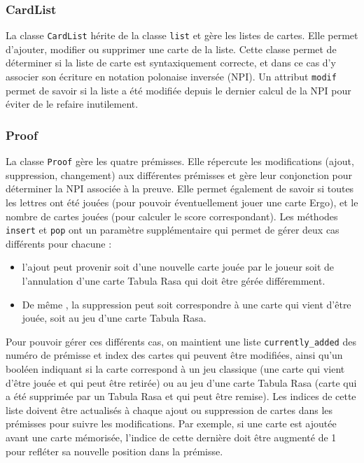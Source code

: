 \documentclass[12pt, a4paper]{article}
\begin{document}
\subsubsection{CardList}

La classe \texttt{CardList} hérite de la classe \texttt{list} et gère les listes de cartes. Elle permet d'ajouter, modifier ou supprimer une carte de la liste. Cette classe permet de déterminer si la liste de carte est syntaxiquement correcte, et dans ce cas d'y associer son écriture en notation polonaise inversée (NPI). Un attribut \texttt{modif} permet de savoir si la liste a été modifiée depuis le dernier calcul de la NPI pour éviter de le refaire inutilement.

\subsubsection{Proof}

La classe \texttt{Proof} gère les quatre prémisses. Elle répercute les modifications (ajout, suppression, changement) aux différentes prémisses et gère leur conjonction pour déterminer la NPI associée à la preuve. Elle permet également de savoir si toutes les lettres ont été jouées (pour pouvoir éventuellement jouer une carte Ergo), et le nombre de cartes jouées (pour calculer le score correspondant). Les méthodes \texttt{insert} et \texttt{pop} ont un paramètre supplémentaire qui permet de gérer deux cas différents pour chacune :
\begin{itemize}
\item l'ajout peut provenir soit d'une nouvelle carte jouée par le joueur soit de l'annulation d'une carte Tabula Rasa qui doit être gérée différemment.
\item De même , la suppression peut soit correspondre à une carte qui vient d'être jouée, soit au jeu d'une carte Tabula Rasa.
\end{itemize}

Pour pouvoir gérer ces différents cas, on maintient une liste \texttt{currently\_added} des numéro de prémisse et index des cartes qui peuvent être modifiées, ainsi qu'un booléen indiquant si la carte correspond à un jeu \og classique \fg (une carte qui vient d'être jouée et qui peut être retirée) ou au jeu d'une carte Tabula Rasa (carte qui a été supprimée par un Tabula Rasa et qui peut être remise). Les indices de cette liste doivent être actualisés à chaque ajout ou suppression de cartes dans les prémisses pour suivre les modifications. Par exemple, si une carte est ajoutée avant une carte mémorisée, l'indice de cette dernière doit être augmenté de 1 pour refléter sa nouvelle position dans la prémisse.
\end{document}
